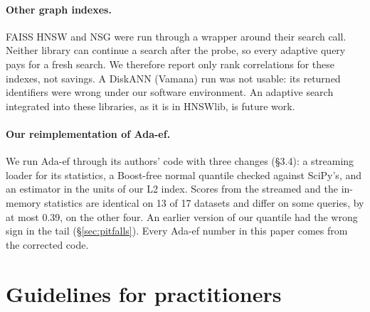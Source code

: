 \documentclass[twocolumn]{svjour3}
\begin{document}
\paragraph{Other graph indexes.}
FAISS HNSW and NSG were run through a wrapper around their search call. Neither library can
continue a search after the probe, so every adaptive query pays for a fresh search. We therefore
report only rank correlations for these indexes, not savings. A DiskANN (Vamana) run was not
usable: its returned identifiers were wrong under our software environment. An adaptive search
integrated into these libraries, as it is in HNSWlib, is future work.

\paragraph{Our reimplementation of Ada-ef.}
We run Ada-ef through its authors' code with three changes (\S3.4): a streaming loader for its
statistics, a Boost-free normal quantile checked against SciPy's, and an estimator in the units of
our L2 index. Scores from the streamed and the in-memory statistics are identical on 13 of 17
datasets and differ on some queries, by at most 0.39, on the other four. An earlier version of our
quantile had the wrong sign in the tail (\S\ref{sec:pitfalls}). Every Ada-ef number in this paper
comes from the corrected code.

\section{Guidelines for practitioners}\label{sec:guidelines}
\end{document}
